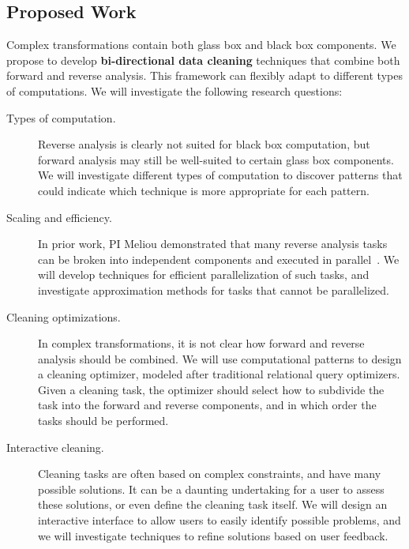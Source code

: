 \subsection{Proposed Work} %
\label{sub:research_plan}

Complex transformations contain both glass box and black box
components. We propose to develop \textbf{bi-directional data
  cleaning} techniques that combine both forward and reverse
analysis. This framework can flexibly adapt to different types of
computations. We will investigate the following research questions:

\begin{description}
	\item[Types of computation.] Reverse analysis is clearly not
          suited for black box computation, but forward analysis may
          still be well-suited to certain glass box components. We
          will investigate different types of computation to discover
          patterns that could indicate which technique is more
          appropriate for each pattern.

	\item[Scaling and efficiency.] In prior work, PI Meliou demonstrated that
          many reverse analysis tasks can be broken into independent
          components and executed in
          parallel~\cite{DBLP:conf/sigmod/MeliouS12}. We will develop
          techniques for efficient parallelization of such tasks, and
          investigate approximation methods for tasks that cannot be
          parallelized.

	\item[Cleaning optimizations.] In complex transformations, it
          is not clear how forward and reverse analysis should be
          combined. We will use computational patterns to design a
          cleaning optimizer, modeled after traditional relational
          query optimizers. Given a cleaning task, the optimizer
          should select how to subdivide the task into the forward and
          reverse components, and in which order the tasks should be
          performed.

	\item[Interactive cleaning.] Cleaning tasks are often based on
          complex constraints, and have many possible solutions. It
          can be a daunting undertaking for a user to assess these
          solutions, or even define the cleaning task itself.  We will
          design an interactive interface to allow users to easily
          identify possible problems, and we will investigate
          techniques to refine solutions based on user feedback.

\end{description}





